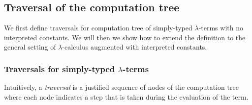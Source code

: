\subsection{Traversal of the computation tree}
\label{subsec:traversal} We first define traversals for computation
tree of simply-typed $\lambda$-terms with no interpreted constants.
We will then we show how to extend the definition to the general
setting of $\lambda$-calculus augmented with interpreted constants.

\subsubsection{Traversals for simply-typed $\lambda$-terms}
Intuitively, a \emph{traversal} is a justified sequence of nodes of the computation tree where each node
indicates a step that is taken during the evaluation of the term.

